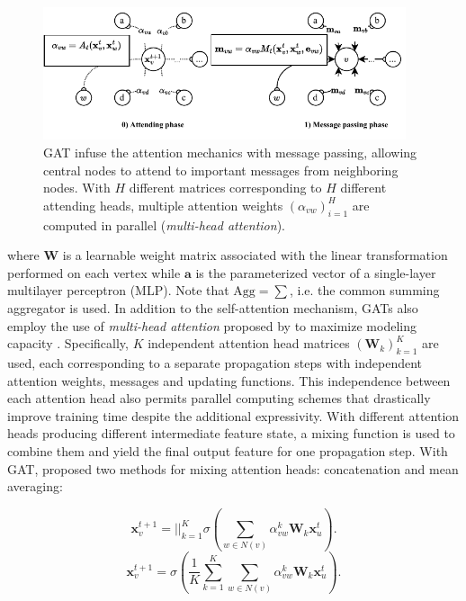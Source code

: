 \begin{figure}
  \begin{center}
    \includegraphics[width=0.95\textwidth]{figures/gat.pdf}
  \end{center}
  \caption{GAT infuse the attention mechanics with message passing, allowing
  central nodes to attend to important messages from neighboring nodes. With
  $H$ different matrices corresponding to $H$ different attending heads,
  multiple attention weights $(\alpha_{vw})_{i=1}^H$ are computed in parallel
  (\textit{multi-head attention}).}
  \label{fig:gat}
\end{figure}


where $\mathbf{W}$ is a learnable weight matrix associated with the linear
transformation performed on each vertex while $\mathbf{a}$ is the parameterized
vector of a single-layer multilayer perceptron (MLP). Note that $\text{Agg} =
\sum$, i.e. the common summing aggregator is used. In addition to the
self-attention mechanism, GATs also employ the use of \textit{multi-head
attention} proposed by \citep{vaswaniAttentionAllYou2017} to maximize modeling
capacity . Specifically, $K$ independent attention head matrices
$(\mathbf{W}_k)_{k=1}^K$ are used, each corresponding to a separate propagation
steps with independent attention weights, messages and updating functions. This
independence between each attention head also permits parallel computing schemes
that drastically improve training time despite the additional expressivity. With
different attention heads producing different intermediate feature state, a
mixing function is used to combine them and yield the final output feature for
one propagation step. With GAT, \citep{velickovicGraphAttentionNetworks2018}
proposed two methods for mixing attention heads: concatenation and mean
averaging:

$$
\mathbf{x}_{v}^{t+1} = \bigg\lvert\bigg\lvert_{k=1}^K \sigma\left(\sum_{w \in
N(v)}\alpha_{vw}^k \mathbf{W}_{k} \mathbf{x}_{u}^t\right)
.$$
$$
\mathbf{x}_{v}^{t+1} = \sigma\left(\frac{1}{K}\sum_{k=1}^K\sum_{w \in
N(v)}\alpha_{vw}^k \mathbf{W}_{k} \mathbf{x}_{u}^t \right)
.$$

